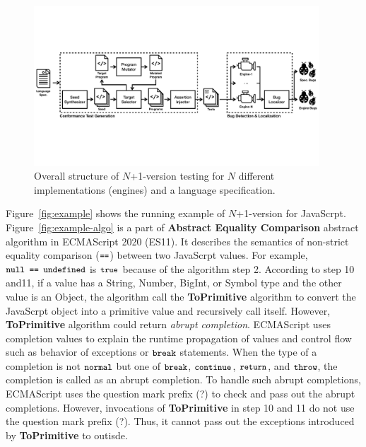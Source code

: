 \begin{figure}[t]
  \centering
  \includegraphics[width=0.95\textwidth]{img/n+1-version-testing.pdf}
  \caption{Overall structure of $N$+1-version testing for $N$ different
    implementations (engines) and a language specification.}
  \label{fig:overall}
  \vspace*{-1em}
\end{figure}

Figure~\ref{fig:example} shows the running example of $N$+1-version for
JavaScrpt.  Figure~\ref{fig:example-algo} is a part of \textbf{Abstract Equality
Comparison} abstract algorithm in ECMAScript 2020 (ES11).  It describes the
semantics of non-strict equality comparison ($\code{==}$) between two JavaScrpt
values.  For example, $\code{null == undefined}$ is $\code{true}$ because of the
algorithm step 2.  According to step 10 and11, if a value has a String, Number,
BigInt, or Symbol type and the other value is an Object, the algorithm call the
\textbf{ToPrimitive} algorithm to convert the JavaScrpt object into a primitive
value and recursively call itself.  However, \textbf{ToPrimitive} algorithm
could return \textit{abrupt completion}.  ECMAScript uses completion values to
explain the runtime propagation of values and control flow such as behavior of
exceptions or $\code{break}$ statements.  When the type of a completion is not
$\code{normal}$ but one of $\code{break}$, $\code{continue}$, $\code{return}$,
and $\code{throw}$, the completion is called as an abrupt completion.  To handle
such abrupt completions, ECMAScript uses the question mark prefix (?) to check
and pass out the abrupt completions.  However, invocations of
\textbf{ToPrimitive} in step 10 and 11 do not use the question mark prefix (?).
Thus, it cannot pass out the exceptions introduced by \textbf{ToPrimitive} to
outisde.

